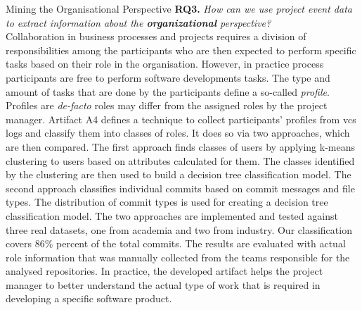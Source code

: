 \begin{question}{Mining the Organisational Perspective}
	\textbf{RQ3.} \emph{How can we use project event data to extract information about the \textbf{organizational} perspective?}\\
	
	
	Collaboration in business processes and projects requires a division of responsibilities among the participants who are then expected to perform specific tasks based on their role in the organisation. However, in practice process participants are free to perform software developments tasks. The type and amount of tasks that are done by the participants define a so-called \emph{profile}. Profiles are \emph{de-facto} roles may differ from the assigned roles by the project manager. Artifact A4 defines a technique to collect participants' profiles from \gls{vcs} logs and classify them into classes of roles. It does so via two approaches, which are then compared. The first approach finds classes of users by applying k-means clustering to users based on attributes calculated for them. The classes identified by the clustering are then used to build a decision tree classification model. The second approach classifies individual commits based on commit messages and file types. The distribution of commit types is used for creating a decision tree classification model. The two approaches are implemented and tested against three real datasets, one from academia and two from industry. Our classification covers 86\% percent of the total commits. The results are evaluated with actual role information that was manually collected from the teams responsible for the analysed repositories. In practice, the developed artifact helps the project manager to better understand the actual type of work that is required in developing a specific software product.
\end{question}

 



